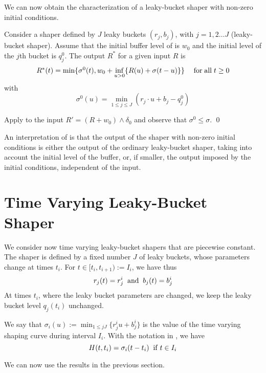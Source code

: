 We can now obtain the characterization of a leaky-bucket shaper
 with non-zero initial conditions.
\begin{theorem}  Consider a shaper defined
by $J$ leaky buckets $(r_j,b_j)$, with $j=1,2 \dots J$
(leaky-bucket  shaper). Assume that the initial buffer level of
 is $w_0$ and the initial level
of the $j$th bucket is $q_j^0$. The output $R^*$ for a given input
$R$ is
\begin{equation}
\mylabel{l23b-enz}
\begin{array}{lr}
R^*(t)= \min \{ \sigma^0(t), w_0 + \displaystyle \inf_{u>0} \{
R(u) + \sigma(t-u) \} \} &\mfa t \geq 0
\end{array}
\end{equation}
with
\[
\sigma^0(u)=\displaystyle \min_{1 \leq j \leq J} ( r_j \cdot u +
                b_j - q_j^0 )
\]
\end{theorem}
\pr
Apply  to the input $R'=(R+ w_0) \wedge
\delta_0$ and observe that $\sigma^0 \leq \sigma$. \qed

An interpretation of  is that the output of the
shaper with non-zero initial conditions is either the output of
the ordinary leaky-bucket shaper, taking into account the initial
level of the buffer, or, if smaller, the output imposed by the
initial conditions, independent of the input.
%
\section{Time Varying Leaky-Bucket Shaper}

We consider now time varying leaky-bucket shapers that are
piecewise constant. The shaper is defined by a fixed number $J$ of
leaky buckets, whose parameters change at times $t_i$. For $t \in
[t_i, t_{i+1}):=I_i$, we have thus
$$
r_j(t)=r_j^i \; \mathrm{\; and \; } \; b_j(t)=b_j^i
$$
At times $t_i$, where the leaky bucket parameters are changed, we
keep the leaky bucket level $q_j(t_i)$ unchanged.

We say that $\sigma_i(u):=\min_{1\leq j J}\{r_j^i u + b_j^i\}$ is
the value of the time varying shaping curve during interval $I_i$.
With the notation in , we have
$$
H(t,t_i)=\sigma_i(t-t_i) \;\mathrm{\; if \; } t \in I_i
$$

We can now use the results in the previous section.

